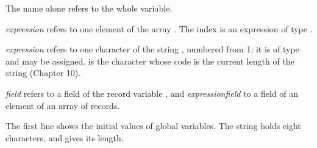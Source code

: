 
The name alone refers to the whole variable.

\code{A[}\textit{expression}\code{]} refers to one
element of the array .  The index is an expression of type
.

\code{S[}\textit{expression}\code{]} refers to
one character of the string , numbered from 1; it is of type
 and may be assigned.   is the character whose code is
the current length of the string (Chapter 10).

\textit{field} refers to a field of the record
variable , and \code{A[}\textit{expression}\code{].}\textit{field}
to a field of an element of an array of records.




The first line shows the initial values of global variables.  The string
 holds eight characters, and  gives its length.
